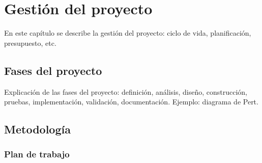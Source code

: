 \chapter{Gestión del proyecto}

En este capítulo se describe la gestión del proyecto: ciclo de vida, planificación, presupuesto, etc.

\section{Fases del proyecto}

Explicación de las fases del proyecto: definición, análisis, diseño, construcción, pruebas, implementación, validación, documentación. Ejemplo: diagrama de Pert.

\section{Metodología}
\subsection{Plan de trabajo}

